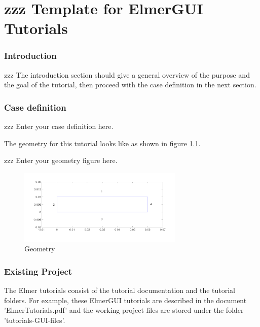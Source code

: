\chapter{zzz Template for ElmerGUI Tutorials}



\subsection*{Introduction}

zzz The introduction section should give a general overview of the purpose and the goal of the tutorial, then proceed with the case definition in the next section.

\subsection*{Case definition}

zzz Enter your case definition here.

The geometry for this tutorial looks like as shown in figure \ref{fg:geometry}.

zzz Enter your geometry figure here.

\begin{figure}[H]
\centering
\includegraphics[width=0.7\textwidth]{geometry.png}
\caption{Geometry}\label{fg:geometry}
\end{figure}  

\subsection*{Existing Project}

The Elmer tutorials consist of the tutorial documentation and the tutorial folders.  For example, these ElmerGUI tutorials are described in the document 'ElmerTutorials.pdf' and the working project files are stored under the folder 'tutorials-GUI-files'.  

